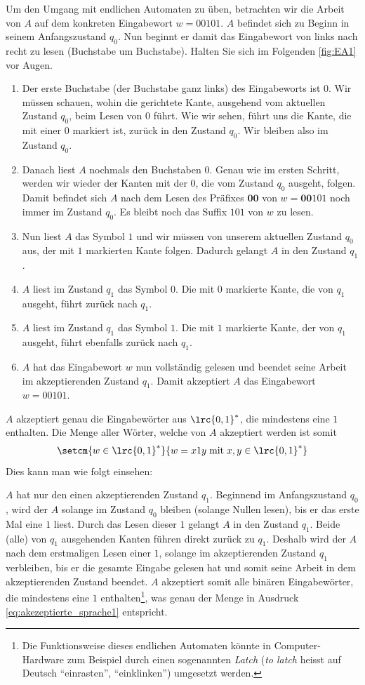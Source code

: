Um den Umgang mit endlichen Automaten zu üben, betrachten wir die Arbeit von $A$ auf dem konkreten Eingabewort $w = 00101$. $A$ befindet sich zu Beginn in seinem Anfangszustand $q_0$. Nun beginnt er damit das Eingabewort von links nach recht zu lesen (Buchstabe um Buchstabe). Halten Sie sich im Folgenden \cref{fig:EA1} vor Augen.
\begin{enumerate}
	\item Der erste Buchstabe (der Buchstabe ganz links) des Eingabeworts ist $0$. Wir müssen schauen, wohin die gerichtete Kante, ausgehend vom aktuellen Zustand $q_0$, beim Lesen von $0$ führt. Wie wir sehen, führt uns die Kante, die mit einer $0$ markiert ist, zurück in den Zustand $q_0$. Wir bleiben also im Zustand $q_0$.
	\item Danach liest $A$ nochmals den Buchstaben $0$. Genau wie im ersten Schritt, werden wir wieder der Kanten mit der $0$, die vom Zustand $q_0$ ausgeht, folgen. Damit befindet sich $A$ nach dem Lesen des Präfixes $\mathbf{00}$ von $w = \mathbf{00}101$ noch immer im Zustand $q_0$. Es bleibt noch das Suffix $101$ von $w$ zu lesen.
	\item Nun liest $A$ das Symbol $1$ und wir müssen von unserem aktuellen Zustand $q_0$ aus, der mit $1$ markierten Kante folgen. Dadurch gelangt $A$ in den Zustand $q_1$.
	\item $A$ liest im Zustand $q_1$ das Symbol $0$. Die mit $0$ markierte Kante, die von $q_1$ ausgeht, führt zurück nach $q_1$.
	\item $A$ liest im Zustand $q_1$ das Symbol $1$. Die mit $1$ markierte Kante, der von $q_1$ ausgeht, führt ebenfalls zurück nach $q_1$.
	\item $A$ hat das Eingabewort $w$ nun vollständig gelesen und beendet seine Arbeit im akzeptierenden Zustand $q_1$. Damit akzeptiert $A$ das Eingabewort $w = 00101$.
\end{enumerate}
$A$ akzeptiert genau die Eingabewörter aus $\lrc{0,1}^*$, die mindestens eine $1$ enthalten. Die Menge aller Wörter, welche von $A$ akzeptiert werden ist somit
\begin{align}\label{eq:akezeptierte_sprache1}
	\setcm{w\in\lrc{0,1}^*}{w = x1y\;\text{mit}\;x,y\in\lrc{0,1}^*}
\end{align}
Dies kann man wie folgt einsehen:

$A$ hat nur den einen akzeptierenden Zustand $q_1$. Beginnend im Anfangszustand $q_0$, wird der $A$ solange im Zustand $q_0$ bleiben (solange Nullen lesen), bis er das erste Mal eine $1$ liest. Durch das Lesen dieser $1$ gelangt $A$ in den Zustand $q_1$. Beide (alle) von $q_1$ ausgehenden Kanten führen direkt zurück zu $q_1$. Deshalb wird der $A$ nach dem erstmaligen Lesen einer $1$, solange im akzeptierenden Zustand $q_1$ verbleiben, bis er die gesamte Eingabe gelesen hat und somit seine Arbeit in dem akzeptierenden Zustand beendet. $A$ akzeptiert somit alle binären Eingabewörter, die mindestens eine $1$ enthalten\footnote{Die Funktionsweise dieses endlichen Automaten könnte in Computer-Hardware zum Beispiel durch einen sogenannten \textit{Latch} (\textit{to latch} heisst auf Deutsch \enquote{einrasten}, \enquote{einklinken}) umgesetzt werden.}, was genau der Menge in Ausdruck \cref{eq:akezeptierte_sprache1} entspricht.

